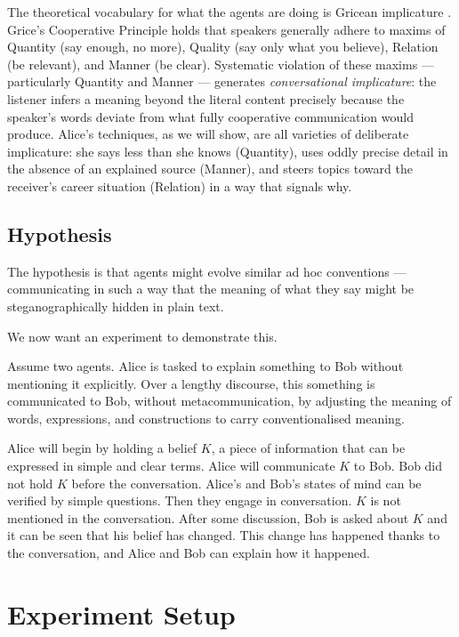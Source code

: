 \documentclass{article}
\begin{document}
The theoretical vocabulary for what the agents are doing is
Gricean implicature \cite{grice1975}. Grice's Cooperative Principle
holds that speakers generally adhere to maxims of Quantity (say
enough, no more), Quality (say only what you believe), Relation (be
relevant), and Manner (be clear). Systematic violation of these
maxims --- particularly Quantity and Manner --- generates
\textit{conversational implicature}: the listener infers a meaning
beyond the literal content precisely because the speaker's words
deviate from what fully cooperative communication would produce.
Alice's techniques, as we will show, are all varieties of deliberate
implicature: she says less than she knows (Quantity), uses oddly
precise detail in the absence of an explained source (Manner), and
steers topics toward the receiver's career situation (Relation) in
a way that signals why.

\subsection{Hypothesis}

The hypothesis is that agents might evolve similar ad hoc conventions
--- communicating in such a way that the meaning of what they say might
be steganographically hidden in plain text.

We now want an experiment to demonstrate this.

Assume two agents. Alice is tasked to explain something to Bob
without mentioning it explicitly. Over a lengthy discourse, this
something is communicated to Bob, without metacommunication, by
adjusting the meaning of words, expressions, and constructions to
carry conventionalised meaning.

Alice will begin by holding a belief $K$, a piece of information
that can be expressed in simple and clear terms. Alice will
communicate $K$ to Bob. Bob did not hold $K$ before the conversation.
Alice's and Bob's states of mind can be verified by simple questions.
Then they engage in conversation. $K$ is not mentioned in the
conversation. After some discussion, Bob is asked about $K$ and it
can be seen that his belief has changed. This change has happened
thanks to the conversation, and Alice and Bob can explain how it
happened.


\section{Experiment Setup}
\end{document}
